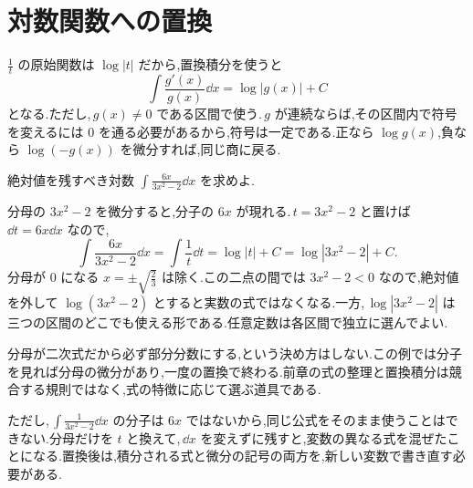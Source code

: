\section{対数関数への置換}\label{節:対数型の置換}

$\frac1t$ の原始関数は $\log|t|$ だから,置換積分を使うと
\[
 \int\frac{g'(x)}{g(x)}\dd x=\log|g(x)|+C
\]
となる.ただし,\,$g(x)\ne0$ である区間で使う.\,$g$ が連続ならば,その区間内で符号を変えるには $0$ を通る必要があるから,符号は一定である.正なら $\log g(x)$,負なら $\log(-g(x))$ を微分すれば,同じ商に戻る.

\begin{example}{絶対値を残すべき対数}
$\int\frac{6x}{3x^2-2}\dd x$ を求めよ.
\end{example}

分母の $3x^2-2$ を微分すると,分子の $6x$ が現れる.\,$t=3x^2-2$ と置けば $\dd t=6x\dd x$ なので,
\[
 \int\frac{6x}{3x^2-2}\dd x
 =\int\frac1t\dd t
 =\log|t|+C
 =\log|3x^2-2|+C.
\]
分母が $0$ になる $x=\pm\sqrt{\frac23}$ は除く.この二点の間では $3x^2-2<0$ なので,絶対値を外して $\log(3x^2-2)$ とすると実数の式ではなくなる.一方,\,$\log|3x^2-2|$ は三つの区間のどこでも使える形である.任意定数は各区間で独立に選んでよい.

分母が二次式だから必ず部分分数にする,という決め方はしない.この例では分子を見れば分母の微分があり,一度の置換で終わる.前章の式の整理と置換積分は競合する規則ではなく,式の特徴に応じて選ぶ道具である.

ただし,\,$\int\frac1{3x^2-2}\dd x$ の分子は $6x$ ではないから,同じ公式をそのまま使うことはできない.分母だけを $t$ と換えて,\,$\dd x$ を変えずに残すと,変数の異なる式を混ぜたことになる.置換後は,積分される式と微分の記号の両方を,新しい変数で書き直す必要がある.


